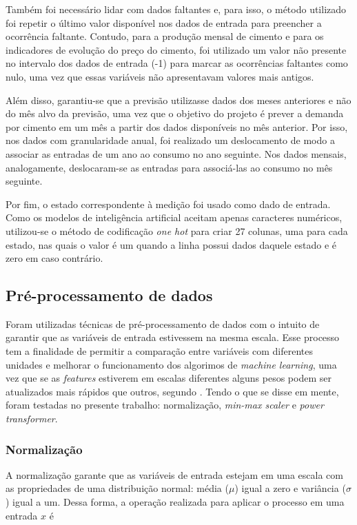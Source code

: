 Também foi necessário lidar com dados faltantes e, para isso, o método utilizado foi
repetir o último valor disponível nos dados de entrada para
preencher a ocorrência faltante. Contudo, para a produção mensal de cimento e para os 
indicadores de evolução do preço do cimento, foi utilizado um valor não 
presente no intervalo dos dados de entrada (-1) para marcar as ocorrências 
faltantes como nulo, uma vez que essas variáveis não apresentavam 
valores mais antigos.

Além disso, garantiu-se que a previsão
 utilizasse dados dos meses anteriores e não do mês alvo da
previsão, uma vez que o objetivo do projeto é prever a demanda
por cimento em um mês a partir dos dados disponíveis no mês anterior.
Por isso, nos dados com granularidade anual, foi realizado um 
deslocamento de modo a associar as entradas de um ano ao consumo no 
ano seguinte. Nos dados mensais, analogamente, deslocaram-se as entradas 
para associá-las ao consumo no mês seguinte.

Por fim, o estado correspondente à medição foi usado como dado de entrada. 
Como os modelos de inteligência artificial aceitam apenas caracteres numéricos,
utilizou-se o método de codificação \textit{one hot} para criar 27 colunas, uma
para cada estado, nas quais o valor é um quando a linha possui dados daquele estado 
e é zero em caso contrário.


\subsection{Pré-processamento de dados}
\label{sec:norm_dados}

Foram utilizadas técnicas de pré-processamento de dados 
com o intuito de garantir que as variáveis de entrada 
estivessem na mesma escala. Esse processo tem a finalidade de permitir a comparação 
entre variáveis com diferentes unidades e melhorar o funcionamento dos 
algorimos de \textit{machine learning}, uma vez que se as \textit{features} estiverem em escalas diferentes
alguns pesos podem ser atualizados mais rápidos que outros, segundo \citet{Raschka}.
Tendo o que se disse em mente, foram testadas no presente trabalho: normalização, 
\textit{min-max scaler} e \textit{power transformer}.

\subsubsection{Normalização}

A normalização garante que as variáveis de entrada estejam em uma 
escala com as propriedades de uma distribuição normal: média ($\mu$)
igual a zero e variância ($\sigma$) igual a um. Dessa forma, a operação 
realizada para aplicar o processo em uma entrada $x$ é

